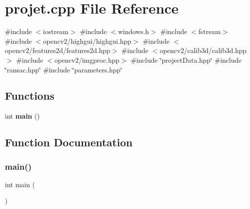 \section{projet.\+cpp File Reference}
\label{projet_8cpp}
{\ttfamily \#include $<$iostream$>$}\newline
{\ttfamily \#include $<$windows.\+h$>$}\newline
{\ttfamily \#include $<$fstream$>$}\newline
{\ttfamily \#include $<$opencv2/highgui/highgui.\+hpp$>$}\newline
{\ttfamily \#include $<$opencv2/features2d/features2d.\+hpp$>$}\newline
{\ttfamily \#include $<$opencv2/calib3d/calib3d.\+hpp$>$}\newline
{\ttfamily \#include $<$opencv2/imgproc.\+hpp$>$}\newline
{\ttfamily \#include \char`\"{}project\+Data.\+hpp\char`\"{}}\newline
{\ttfamily \#include \char`\"{}ransac.\+hpp\char`\"{}}\newline
{\ttfamily \#include \char`\"{}parameters.\+hpp\char`\"{}}\newline
\subsection*{Functions}
\begin{DoxyCompactItemize}
\item 
int \textbf{ main} ()
\end{DoxyCompactItemize}


\subsection{Function Documentation}
\mbox{\label{projet_8cpp_ae66f6b31b5ad750f1fe042a706a4e3d4}} 
\subsubsection{main()}
{\footnotesize\ttfamily int main (\begin{DoxyParamCaption}{ }\end{DoxyParamCaption})}

